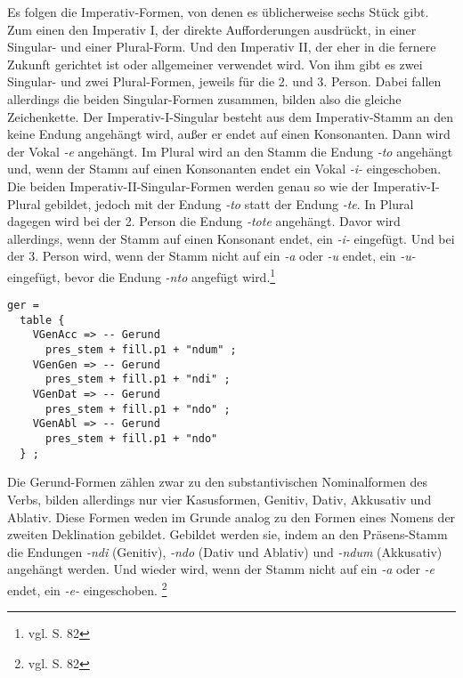 Es folgen die Imperativ-Formen, von denen es üblicherweise sechs Stück gibt. Zum einen den Imperativ I, der direkte Aufforderungen ausdrückt, in einer Singular- und einer Plural-Form. Und den Imperativ II, der eher in die fernere Zukunft gerichtet ist oder allgemeiner verwendet wird. Von ihm gibt es zwei Singular- und zwei Plural-Formen, jeweils für die 2. und 3. Person. Dabei fallen allerdings die beiden Singular-Formen zusammen, bilden also die gleiche Zeichenkette. Der Imperativ-I-Singular besteht aus dem Imperativ-Stamm an den keine Endung angehängt wird, außer er endet auf einen Konsonanten. Dann wird der Vokal \textit{-e} angehängt. Im Plural wird an den Stamm die Endung \textit{-to} angehängt und, wenn der Stamm auf einen Konsonanten endet ein Vokal \textit{-i-} eingeschoben. Die beiden Imperativ-II-Singular-Formen werden genau so wie der Imperativ-I-Plural gebildet, jedoch mit der Endung \textit{-to} statt der Endung \textit{-te}. In Plural dagegen wird bei der 2. Person die Endung \textit{-tote} angehängt. Davor wird allerdings, wenn der Stamm auf einen Konsonant endet, ein \textit{-i-} eingefügt. Und bei der 3. Person wird, wenn der Stamm nicht auf ein \textit{-a} oder \textit{-u} endet, ein \textit{-u-} eingefügt, bevor die Endung \textit{-nto} angefügt wird.\footnote{vgl. \cite{BAYER-LINDAUER1994} S. 82} \par
\begin{lstlisting}[float=h!tp,caption={Ausschnitt aus der Funktion \texttt{mkVerb} um Gerundiv-Verbformen zu bilden (vgl. \textbf{ResLat.gf})},label={GF-Res-MkVerb-Ger},basicstyle=\small]
ger = 
  table {
    VGenAcc => -- Gerund
      pres_stem + fill.p1 + "ndum" ;
    VGenGen => -- Gerund
      pres_stem + fill.p1 + "ndi" ;
    VGenDat => -- Gerund
      pres_stem + fill.p1 + "ndo" ;
    VGenAbl => -- Gerund
      pres_stem + fill.p1 + "ndo" 
  } ;
\end{lstlisting}
Die Gerund-Formen zählen zwar zu den substantivischen Nominalformen des Verbs, bilden allerdings nur vier Kasusformen, Genitiv, Dativ, Akkusativ und Ablativ. Diese Formen weden im Grunde analog zu den Formen eines Nomens der zweiten Deklination gebildet. Gebildet werden sie, indem an den Präsens-Stamm die Endungen \textit{-ndi} (Genitiv), \textit{-ndo} (Dativ und Ablativ) und \textit{-ndum} (Akkusativ) angehängt werden. Und wieder wird, wenn der Stamm nicht auf ein \textit{-a} oder \textit{-e} endet, ein \textit{-e-} eingeschoben. \footnote{vgl. \cite{BAYER-LINDAUER1994} S. 82} \par
